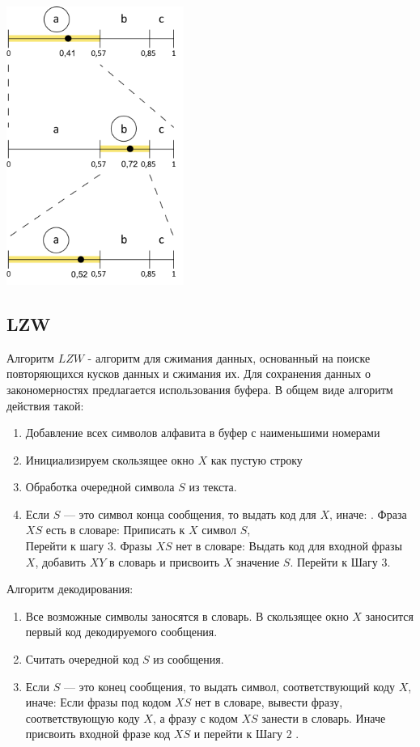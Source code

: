 \documentclass{article}
\begin{document}
\begin{center}
  \includegraphics[height=9.1cm]{arif2.png}
\end{center}
\subsection{LZW}
Алгоритм $LZW$ - алгоритм для сжимания данных, основанный на поиске повторяющихся кусков данных и сжимания их. Для сохранения данных о закономерностях предлагается использования буфера. В общем виде алгоритм действия такой:
\begin{enumerate}
    \item Добавление всех символов алфавита в буфер с наименьшими номерами
    \item Инициализируем скользящее окно $X$ как пустую строку
    \item Обработка очередной символа $S$ из текста.
    \item Если $S$ — это символ конца сообщения, то выдать код для $X$, иначе:
    . Фраза $XS$ есть в словаре:
    Приписать к $X$ символ $S$, \\Перейти к шагу 3.
     Фразы $XS$ нет в словаре:
    Выдать код для входной фразы $X$, добавить $XY$ в словарь и присвоить $X$ значение $S$. Перейти к Шагу 3. 
\end{enumerate}

Алгоритм декодирования:
\begin{enumerate}
    \item Все возможные символы заносятся в словарь. В скользящее окно $X$
    заносится первый код декодируемого сообщения.
    \item  Считать очередной код $S$ из сообщения.
    \item Если $S$ — это конец сообщения, то выдать символ, соответствующий коду $X$, иначе:
     Если фразы под кодом $XS$ нет в словаре, вывести фразу, соответствующую коду $X$, а фразу с кодом $XS$
    занести в словарь.
     Иначе присвоить входной фразе код $XS$ и перейти к Шагу 2 .
\end{enumerate}
\end{document}
